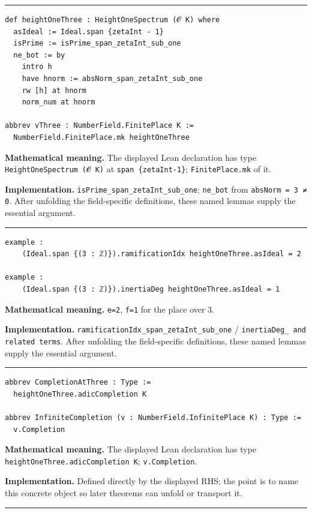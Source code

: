 \documentclass[UTF8,a4paper,11pt,fontset=fandol]{ctexart}
\theoremstyle{definition}
\newcommand{\statementsep}{\par\medskip\hrule\medskip}
\begin{document}
\statementsep
\begin{verbatim}
def heightOneThree : HeightOneSpectrum (𝓞 K) where
  asIdeal := Ideal.span {zetaInt - 1}
  isPrime := isPrime_span_zetaInt_sub_one
  ne_bot := by
    intro h
    have hnorm := absNorm_span_zetaInt_sub_one
    rw [h] at hnorm
    norm_num at hnorm

abbrev vThree : NumberField.FinitePlace K :=
  NumberField.FinitePlace.mk heightOneThree
\end{verbatim}
\noindent\textbf{Mathematical meaning.} The displayed Lean declaration has type \texttt{HeightOneSpectrum (𝓞 K)} at \texttt{span \{zetaInt-1\}}; \texttt{FinitePlace.\allowbreak{}mk} of it.\par
\noindent\textbf{Implementation.} \texttt{isPrime\_\allowbreak{}span\_\allowbreak{}zetaInt\_\allowbreak{}sub\_\allowbreak{}one}; \texttt{ne\_\allowbreak{}bot} from \texttt{absNorm = 3 ≠ 0}. After unfolding the field-specific definitions, these named lemmas supply the essential argument.\par
\statementsep
\begin{verbatim}
example :
    (Ideal.span {(3 : ℤ)}).ramificationIdx heightOneThree.asIdeal = 2

example :
    (Ideal.span {(3 : ℤ)}).inertiaDeg heightOneThree.asIdeal = 1
\end{verbatim}
\noindent\textbf{Mathematical meaning.} \texttt{e=2}, \texttt{f=1} for the place over 3.\par
\noindent\textbf{Implementation.} \texttt{ramificationIdx\_\allowbreak{}span\_\allowbreak{}zetaInt\_\allowbreak{}sub\_\allowbreak{}one} / \texttt{inertiaDeg\_\allowbreak{} and related terms}. After unfolding the field-specific definitions, these named lemmas supply the essential argument.\par
\statementsep
\begin{verbatim}
abbrev CompletionAtThree : Type :=
  heightOneThree.adicCompletion K

abbrev InfiniteCompletion (v : NumberField.InfinitePlace K) : Type :=
  v.Completion
\end{verbatim}
\noindent\textbf{Mathematical meaning.} The displayed Lean declaration has type \texttt{heightOneThree.\allowbreak{}adicCompletion K}; \texttt{v.\allowbreak{}Completion}.\par
\noindent\textbf{Implementation.} Defined directly by the displayed RHS; the point is to name this concrete object so later theorems can unfold or transport it.\par
\statementsep
\end{document}
